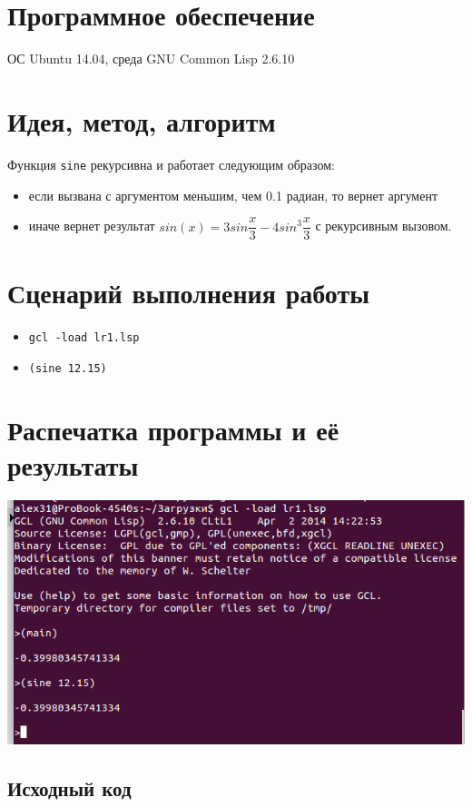 \documentclass[12pt]{article}
\begin{document}
\section{Программное обеспечение}
ОС Ubuntu 14.04, среда GNU Common Lisp 2.6.10

\section{Идея, метод, алгоритм}
Функция {\tt sine} рекурсивна и работает следующим образом:
\begin{itemize}
\setlength{\itemsep}{-1mm} %
\item если вызвана с аргументом меньшим, чем 0.1 радиан, то вернет аргумент
\item иначе вернет результат $sin(x) = 3sin\dfrac{x}{3} - 4sin^3\dfrac{x}{3}$ с рекурсивным вызовом.
\end{itemize}

\section{Сценарий выполнения работы}
\begin{itemize}
\item{\tt gcl -load lr1.lsp}
\item{\tt (sine 12.15)}
\end{itemize}
\section{Распечатка программы и её результаты}
\includegraphics[scale=0.7]{lr1Screen}
\subsection{Исходный код}

\end{document}
